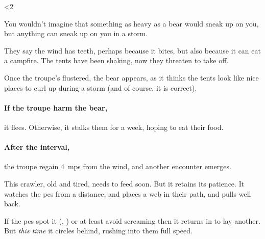 \ifnum\value{temperature}<2

\bear

You wouldn't imagine that something as heavy as a bear would sneak up on you, but anything can sneak up on you in a storm.

\begin{boxtext}
  They say the wind has teeth, perhaps because it bites, but also because it can eat a campfire.
  The tents have been shaking, now they threaten to take off.
\end{boxtext}

Once the troupe's flustered, the bear appears, as it thinks the tents look like nice places to curl up during a storm (and of course, it is correct).

\paragraph{If the troupe harm the bear,}
it flees.
Otherwise, it stalks them for a week, hoping to eat their food.

\paragraph{After the \gls{interval},}
the troupe regain 4~\glspl{mp} from the wind, and another encounter emerges.

\else

This \gls{crawler}, old and tired, needs to feed soon.
But it retains its patience.
It watches the \glspl{pc} from a distance, and places a web in their path, and pulls well back.

\chitincrawler

If the \glspl{pc} spot it (, \tn[10]) or at least avoid screaming then it returns in  to lay another.
But \emph{this time} it circles behind, rushing into them full speed.


\fi
